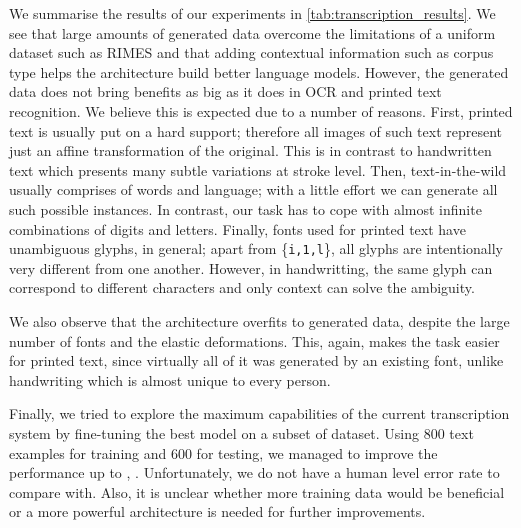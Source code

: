 
	We summarise the results of our experiments in \autoref{tab:transcription_results}. We see that large amounts of generated data overcome the limitations of a uniform dataset such as RIMES and that adding contextual information such as corpus type helps the architecture build better language models. However, the generated data does not bring benefits as big as it does in OCR and printed text recognition. We believe this is expected due to a number of reasons. First, printed text is usually put on a hard support; therefore all images of such text represent just an affine transformation of the original. This is in contrast to handwritten text which presents many subtle variations at stroke level. Then, text-in-the-wild usually comprises of words and language; with a little effort we can generate all such possible instances. In contrast, our task has to cope with almost infinite combinations of digits and letters. Finally, fonts used for printed text have unambiguous glyphs, in general; apart from \{\texttt{i,1,l}\}, all glyphs are intentionally very different from one another. However, in handwritting, the same glyph can correspond to different characters and only context can solve the ambiguity.

	We also observe that the architecture overfits to generated data, despite the large number of fonts and the elastic deformations. This, again, makes the task easier for printed text, since virtually all of it was generated by an existing font, unlike handwriting which is almost unique to every person.

	Finally, we tried to explore the maximum capabilities of the current transcription system by fine-tuning the best model on a subset of  dataset. Using 800 text examples for training and 600 for testing, we managed to improve the performance up to \mbox{}, . Unfortunately, we do not have a human level error rate to compare with. Also, it is unclear whether more training data would be beneficial or a more powerful architecture is needed for further improvements.

